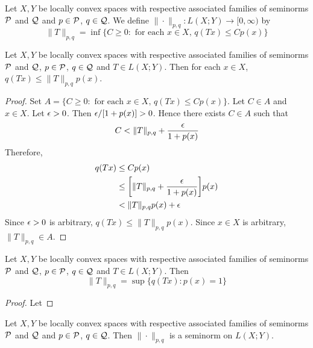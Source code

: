 \documentclass{book}
\begin{document}
\begin{defn}
	Let $X, Y$ be locally convex spaces with respective associated families of seminorms $\mathcal{P}$ and $\mathcal{Q}$ and $p \in \mathcal{P}$, $q \in \mathcal{Q}$. We define $\|\cdot\|_{p,q}: L(X; Y) \rightarrow [0, \infty)$ by 
	$$\|T\|_{p,q} = \inf \{C \geq 0: \text{ for each $x \in X$, $q(Tx) \leq Cp(x)$} \}$$
\end{defn}

\begin{ex}
	Let $X, Y$ be locally convex spaces with respective associated families of seminorms $\mathcal{P}$ and $\mathcal{Q}$, $p \in \mathcal{P}$, $q \in \mathcal{Q}$ and $T \in L(X; Y)$. Then for each $x \in X$, $q(Tx) \leq \|T\|_{p,q}p(x)$. 
\end{ex}

\begin{proof}
	Set $A = \{C \geq 0: \text{ for each $x \in X$, $q(Tx) \leq Cp(x)$} \}$. Let $C \in A$ and $x \in X$. Let $\epsilon >0$. Then $\epsilon / [1 + p(x)] > 0$. Hence there exists $C \in A$ such that $$C < \|T\|_{p,q} + \frac{\epsilon}{1 + p(x)}$$
	Therefore, 
	\begin{align*}
		q(Tx) 
		& \leq Cp(x) \\
		& \leq \bigg[\|T\|_{p,q} + \frac{\epsilon}{1 + p(x)}\bigg]p(x) \\
		& < \|T\|_{p,q}p(x) + \epsilon
	\end{align*}
	Since $\epsilon >0$ is arbitrary, $q(Tx) \leq \|T\|_{p,q}p(x) $. Since $x \in X$ is arbitrary, $\|T\|_{p,q} \in A$. 
\end{proof}

	\begin{ex}
		Let $X, Y$ be locally convex spaces with respective associated families of seminorms $\mathcal{P}$ and $\mathcal{Q}$, $p \in \mathcal{P}$, $q \in \mathcal{Q}$ and $T \in L(X; Y)$. Then 
		$$\|T\|_{p,q} = \sup \{q(Tx): p(x) = 1\}$$
	\end{ex}

	\begin{proof}
		Let 
	\end{proof}

\begin{ex}
	Let $X, Y$ be locally convex spaces with respective associated families of seminorms $\mathcal{P}$ and $\mathcal{Q}$ and $p \in \mathcal{P}$, $q \in \mathcal{Q}$. Then $\|\cdot\|_{p,q}$ is a seminorm  on $L(X; Y)$. 
\end{ex}
\end{document}
